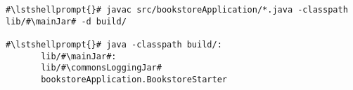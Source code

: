 \begin{lstlisting}[caption=Commands to compile and run the instrumented Bookstore under \UnixLikeSystems{},label=lst:bookstoreStarterLinux]
#\lstshellprompt{}# javac src/bookstoreApplication/*.java -classpath lib/#\mainJar# -d build/

#\lstshellprompt{}# java -classpath build/:
       lib/#\mainJar#:
       lib/#\commonsLoggingJar#
       bookstoreApplication.BookstoreStarter 
\end{lstlisting}
